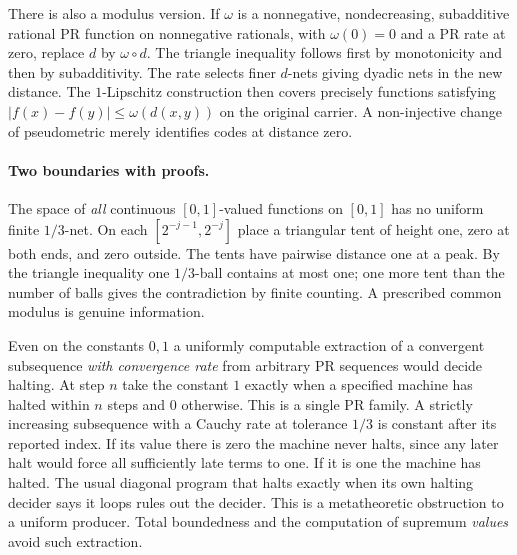 There is also a modulus version. If $\omega$ is a nonnegative, nondecreasing, subadditive rational PR function on nonnegative rationals, with $\omega(0)=0$ and a PR rate at zero, replace $d$ by $\omega\circ d$. The triangle inequality follows first by monotonicity and then by subadditivity. The rate selects finer $d$-nets giving dyadic nets in the new distance. The $1$-Lipschitz construction then covers precisely functions satisfying $|f(x)-f(y)|\le\omega(d(x,y))$ on the original carrier. A non-injective change of pseudometric merely identifies codes at distance zero.

\paragraph{Two boundaries with proofs.}
The space of \emph{all} continuous $[0,1]$-valued functions on $[0,1]$ has no uniform finite $1/3$-net. On each $[2^{-j-1},2^{-j}]$ place a triangular tent of height one, zero at both ends, and zero outside. The tents have pairwise distance one at a peak. By the triangle inequality one $1/3$-ball contains at most one; one more tent than the number of balls gives the contradiction by finite counting. A prescribed common modulus is genuine information.

Even on the constants $0,1$ a uniformly computable extraction of a convergent subsequence \emph{with convergence rate} from arbitrary PR sequences would decide halting. At step $n$ take the constant $1$ exactly when a specified machine has halted within $n$ steps and $0$ otherwise. This is a single PR family. A strictly increasing subsequence with a Cauchy rate at tolerance $1/3$ is constant after its reported index. If its value there is zero the machine never halts, since any later halt would force all sufficiently late terms to one. If it is one the machine has halted. The usual diagonal program that halts exactly when its own halting decider says it loops rules out the decider. This is a metatheoretic obstruction to a uniform producer. Total boundedness and the computation of supremum \emph{values} avoid such extraction.
